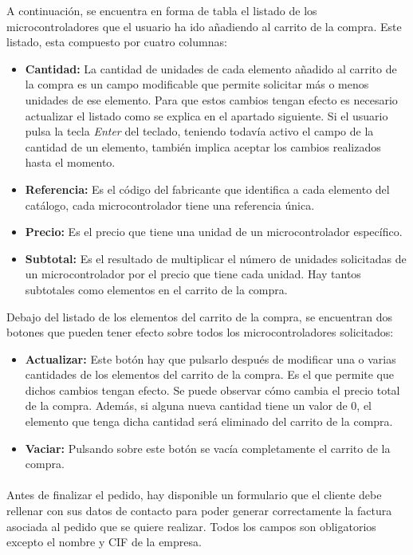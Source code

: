 A continuación, se encuentra en forma de tabla el listado de los microcontroladores que el usuario ha ido añadiendo al carrito de la compra. Este listado, esta compuesto por cuatro columnas: 
\begin{itemize}
	\item \textbf{Cantidad:} La cantidad de unidades de cada elemento añadido al carrito de la compra es un campo modificable que permite	solicitar más o menos unidades de ese elemento. Para que estos cambios tengan efecto es necesario actualizar el listado como se explica en el apartado siguiente. Si el usuario pulsa la tecla \textit{Enter} del teclado, teniendo todavía activo el campo de la cantidad de un elemento, también implica aceptar los cambios realizados hasta el momento.
	
	\item \textbf{Referencia:} Es el código del fabricante que identifica a cada elemento del catálogo, cada microcontrolador
	tiene una referencia única.
	
	\item \textbf{Precio:} Es el precio que tiene una unidad de un microcontrolador específico.

	\item \textbf{Subtotal:} Es el resultado de multiplicar el número de unidades solicitadas de un microcontrolador por el precio que tiene cada unidad. Hay tantos subtotales como elementos en el carrito de la compra.
\end{itemize}

Debajo del listado de los elementos del carrito de la compra, se encuentran dos botones que pueden tener efecto sobre todos los microcontroladores solicitados:
\begin{itemize}
	\item \textbf{Actualizar:}  Este botón hay que pulsarlo después de modificar una o varias cantidades de los elementos del 
	carrito de la compra. Es el que permite que dichos cambios tengan efecto. Se puede observar cómo cambia el precio total de la compra.
	Además, si alguna nueva cantidad tiene un valor de 0, el elemento que tenga dicha cantidad será eliminado del carrito de la compra.
	
	\item \textbf{Vaciar:}  Pulsando sobre este botón se vacía completamente el carrito de la compra.
\end{itemize}

\paragraph{}Antes de finalizar el pedido, hay disponible un formulario que el cliente debe rellenar con sus datos de contacto para poder generar correctamente la factura asociada al pedido que se quiere realizar. Todos los campos son obligatorios excepto el nombre y CIF de la empresa.

